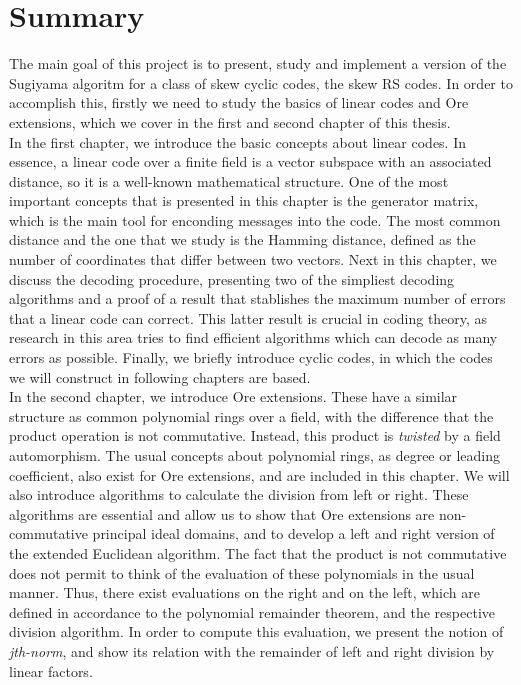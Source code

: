 %

\chapter{Summary}

The main goal of this project is to present, study and implement a version of the Sugiyama algoritm for a class of skew cyclic codes, the skew RS codes. In order to accomplish this, firstly we need to study the basics of linear codes and Ore extensions, which we cover in the first and second chapter of this thesis.\\

In the first chapter, we introduce the basic concepts about linear codes. In essence, a linear code over a finite field is a vector subspace with an associated distance, so it is a well-known mathematical structure. One of the most important concepts that is presented in this chapter is the generator matrix, which is the main tool for enconding messages into the code. The most common distance and the one that we study is the Hamming distance, defined as the number of coordinates that differ between two vectors. Next in this chapter, we discuss the decoding procedure, presenting two of the simpliest decoding algorithms and a proof of a result that stablishes the maximum number of errors that a linear code can correct. This latter result is crucial in coding theory, as research in this area tries to find efficient algorithms which can decode as many errors as possible. Finally, we briefly introduce cyclic codes, in which the codes we will construct in following chapters are based.\\

In the second chapter, we introduce Ore extensions. These have a similar structure as common polynomial rings over a field, with the difference that the product operation is not commutative. Instead, this product is \textit{twisted} by a field automorphism. The usual concepts about polynomial rings, as degree or leading coefficient, also exist for Ore extensions, and are included in this chapter. We will also introduce algorithms to calculate the division from left or right. These algorithms are essential and allow us to show that Ore extensions are non-commutative principal ideal domains, and to develop a left and right version of the extended Euclidean algorithm. The fact that the product is not commutative does not permit to think of the evaluation of these polynomials in the usual manner. Thus, there exist evaluations on the right and on the left, which are defined in accordance to the polynomial remainder theorem, and the respective division algorithm. In order to compute this evaluation, we present the notion of \textit{jth-norm}, and show its relation with the remainder of left and right division by linear factors. \\

